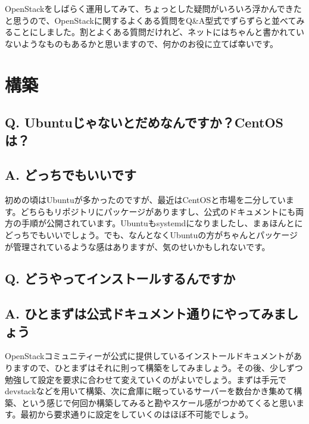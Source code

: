 \documentclass[9pt,b5paper,tombo,openany]{jsbook}
\begin{document}
OpenStackをしばらく運用してみて、ちょっとした疑問がいろいろ浮かんできたと思うので、OpenStackに関するよくある質問をQ\&A型式でずらずらと並べてみることにしました。割とよくある質問だけれど、ネットにはちゃんと書かれていないようなものもあるかと思いますので、何かのお役に立てば幸いです。

\section{構築}

\subsection*{{\bfseries Q.} Ubuntuじゃないとだめなんですか？CentOSは？}
\subsection*{{\bfseries A.} どっちでもいいです}
初めの頃はUbuntuが多かったのですが、最近はCentOSと市場を二分しています。どちらもリポジトリにパッケージがありますし、公式のドキュメントにも両方の手順が公開されています。Ubuntuもsystemdになりましたし、まぁほんとにどっちでもいいでしょう。でも、なんとなくUbuntuの方がちゃんとパッケージが管理されているような感はありますが、気のせいかもしれないです。

\subsection*{{\bfseries Q.} どうやってインストールするんですか}
\subsection*{{\bfseries A.} ひとまずは公式ドキュメント通りにやってみましょう}
OpenStackコミュニティーが公式に提供しているインストールドキュメントがありますので、ひとまずはそれに則って構築をしてみましょう。その後、少しずつ勉強して設定を要求に合わせて変えていくのがよいでしょう。まずは手元でdevstackなどを用いて構築、次に倉庫に眠っているサーバーを数台かき集めて構築、という感じで何回か構築してみると勘やスケール感がつかめてくると思います。最初から要求通りに設定をしていくのはほぼ不可能でしょう。
\end{document}
